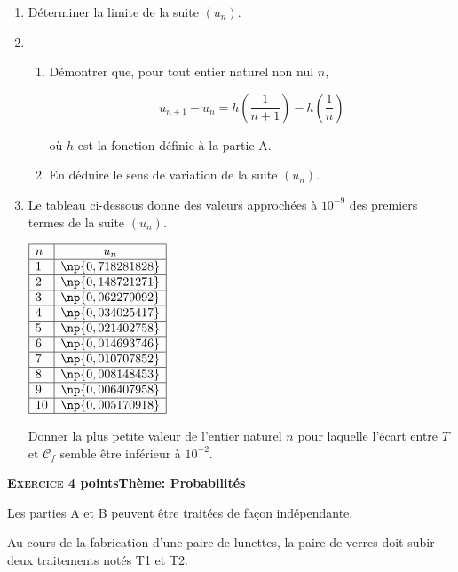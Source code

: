 \documentclass[10pt,a4paper]{article}
\begin{document}
\begin{enumerate}[resume]
\item Déterminer la limite de la suite $\left(u_n\right)$.
\item 
	\begin{enumerate}
		\item Démontrer que, pour tout entier naturel non nul $n$,
		
\[u_{n+1} - u_n = h\left(\dfrac{1}{n + 1}\right) - h\left(\dfrac{1}{n}\right) \]

où $h$ est la fonction définie à la partie A.
		\item En déduire le sens de variation de la suite $\left(u_n\right)$.
	\end{enumerate}
\item Le tableau ci-dessous donne des valeurs approchées à $10^{-9}$ des premiers termes de la suite $\left(u_n\right)$.

\begin{center}
$\begin{array}{|l|c|}\hline
n &u_n\\ \hline
1 &\np{0,718281828}\\ \hline
2 &\np{0,148721271}\\ \hline
3 &\np{0,062279092}\\ \hline
4 &\np{0,034025417}\\ \hline
5 &\np{0,021402758}\\ \hline
6 &\np{0,014693746}\\ \hline
7 &\np{0,010707852}\\ \hline
8 &\np{0,008148453}\\ \hline
9 &\np{0,006407958}\\ \hline
10 &\np{0,005170918}\\ \hline
\end{array}$
\end{center}

Donner la plus petite valeur de l'entier naturel $n$ pour laquelle l'écart entre $T$ et $\mathcal{C}_f$ semble être inférieur à $10^{-2}$.
\end{enumerate}

\bigskip

\textbf{\textsc{Exercice 4}  points\hfill Thème: Probabilités}

\bigskip

Les parties A et B peuvent être traitées de façon indépendante.

\medskip

Au cours de la fabrication d'une paire de lunettes, la paire de verres doit subir deux traitements notés T1 et T2.
\end{document}
